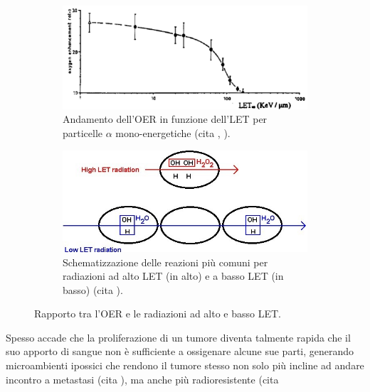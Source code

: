 \documentclass[12pt,a4paper,twoside]{report}
\begin{document}
	\begin{figure}[H]
		\centering
		\begin{subfigure}[t]{0.49\textwidth}
			\centering
			\includegraphics[width=\textwidth, scale=0.50]{let_rbe2.png}
			\caption{Andamento dell'OER in funzione dell'LET per particelle $\alpha$ mono-energetiche (cita
				,
				).}
			\label{fig:let_oer}
		\end{subfigure}
		\hfill
		\begin{subfigure}[t]{0.49\textwidth}
			\centering
			\includegraphics[width=\textwidth, scale=0.50]{reaction_let.jpg}
			\caption{Schematizzazione delle reazioni più comuni per radiazioni ad alto LET (in alto) e a basso LET (in basso) (cita
				).}
			\label{fig:reaction_let}
		\end{subfigure}
		\caption{Rapporto tra l'OER e le radiazioni ad alto e basso LET.}
	\end{figure}
	Spesso accade che la proliferazione di un tumore diventa talmente rapida che il suo apporto di sangue non è sufficiente a ossigenare alcune sue parti, generando microambienti ipossici che rendono il tumore stesso non solo più incline ad andare incontro a metastasi (cita
	), ma anche più radioresistente (cita
\end{document}

